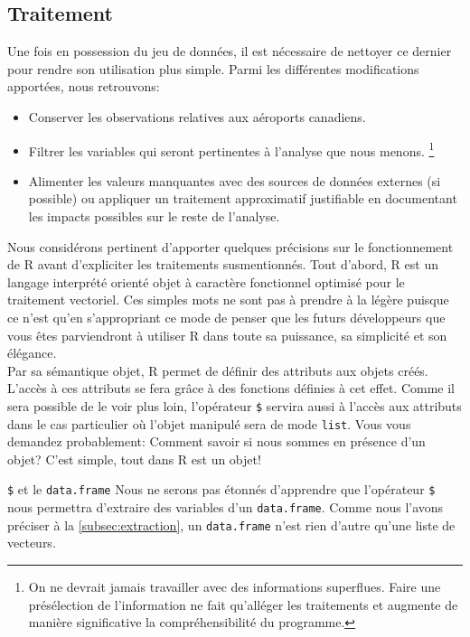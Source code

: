 \subsection{Traitement}
\label{subsec:Traitement}

Une fois en possession du jeu de données, il est nécessaire de nettoyer ce dernier pour rendre son utilisation plus simple. Parmi les différentes modifications apportées, nous retrouvons: \\
\begin{itemize}
	\item Conserver les observations relatives aux aéroports canadiens.
	\item Filtrer les variables qui seront pertinentes à l'analyse que nous menons. 
		\footnote{On ne devrait jamais travailler avec des informations superflues. Faire une présélection de l'information ne fait qu'alléger les traitements et augmente de manière significative la compréhensibilité du programme.}
	\item Alimenter les valeurs manquantes avec des sources de données externes (si possible) ou appliquer un traitement approximatif justifiable en documentant les impacts possibles sur le reste de l'analyse.
\end{itemize}
\vspace{\baselineskip}

Nous considérons pertinent d'apporter quelques précisions sur le fonctionnement de R avant d'expliciter les traitements susmentionnés. Tout d'abord, R est un langage interprété orienté objet à caractère fonctionnel optimisé pour le traitement vectoriel. Ces simples mots ne sont pas à prendre à la légère puisque ce n'est qu'en s'appropriant ce mode de penser que les futurs développeurs que vous êtes parviendront à utiliser R dans toute sa puissance, sa simplicité et son élégance. \\

Par sa sémantique objet, R permet de définir des attributs aux objets créés. L'accès à ces attributs se fera grâce à des fonctions définies à cet effet. Comme il sera possible de le voir plus loin, l'opérateur \texttt{\$} servira aussi à l'accès aux attributs dans le cas particulier où l'objet manipulé sera de mode \texttt{list}.
Vous vous demandez probablement: Comment savoir si nous sommes en présence d'un objet? C'est simple, tout dans R est un objet! \\

\begin{moreInfo}{\texttt{\$} et le \texttt{data.frame}}
	Nous ne serons pas étonnés d'apprendre que l'opérateur \texttt{\$} nous permettra d'extraire des variables d'un \texttt{data.frame}. Comme nous l'avons préciser à la \autoref{subsec:extraction}, un \texttt{data.frame} n'est rien d'autre qu'une liste de vecteurs.
\end{moreInfo}

